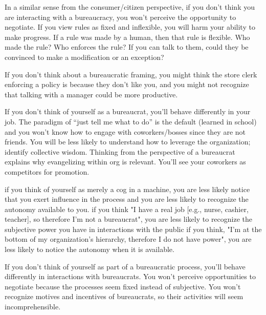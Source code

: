 In a similar sense from the consumer/citizen perspective, if you don't think you are interacting with a bureaucracy, you won't perceive the opportunity to negotiate.  If you view rules as fixed and inflexible, you will harm your ability to make progress. If a rule was made by a human, then that rule is flexible. Who made the rule? Who enforces the rule? If you can talk to them, could they be convinced to make a modification or an exception?

If you don't think about a bureaucratic framing, you might think the store clerk enforcing a policy is because they don't like you, and you might not recognize that talking with a manager could be more productive. 

If you don't think of yourself as a bureaucrat, you'll behave differently in your job. The paradigm of ``just tell me what to do'' is the default (learned in school) and you won't know how to engage with coworkers/bosses since they are not friends. You will be less likely to understand how to leverage the organization; identify collective wisdom. Thinking from the perspective of a bureaucrat explains why evangelizing within org is relevant. 
You'll see your coworkers as competitors for promotion.

if you think of yourself as merely a cog in a machine, you are less likely notice that you exert influence in the process and you are less likely to recognize the autonomy available to you. 
if you think "I have a real job [e.g., nurse, cashier, teacher], so therefore I'm not a bureaucrat", you are less likely to recognize the subjective power you have in interactions with the public
if you think, "I'm at the bottom of my organization's hierarchy, therefore I do not have power", you are less likely to notice the autonomy when it is available.

If you don't think of yourself as part of a bureaucratic process, you'll behave differently in interactions with bureaucrats.  You won't perceive opportunities to negotiate because the processes seem fixed instead of subjective. 
You won't recognize motives and incentives of bureaucrats, so their activities will seem incomprehensible.


